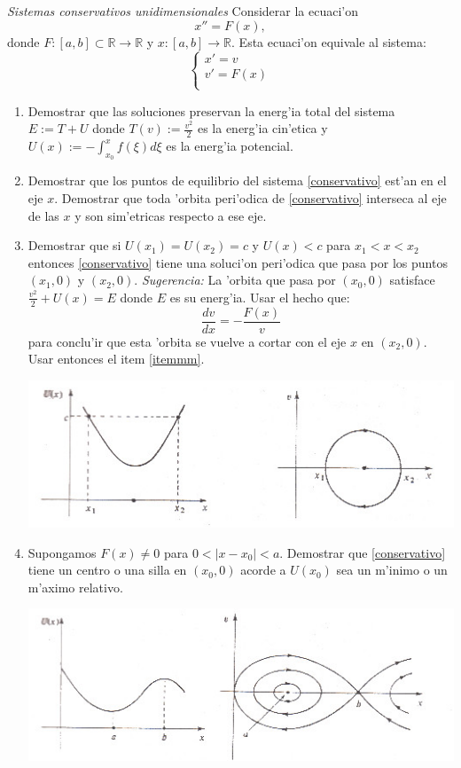 \begin{ejercicio}{}\emph{ Sistemas  conservativos unidimensionales}
Considerar la ecuaci'on
\[
    x''=F(x),
\]
donde $F:[a,b]\subset\mathbb{R}\to\mathbb{R}$ y
$x:[a,b]\to\mathbb{R}$. Esta ecuaci'on equivale al sistema:
\begin{equation}\label{conservativo}
    \left\{%
\begin{array}{ll}
    x'=v \\
    v'=F(x) \\
\end{array}%
\right.
\end{equation}

\begin{enumerate}
\item Demostrar que las soluciones preservan la energ'ia total del sistema
$E:=T+U$ donde $T(v):=\frac{v^2}{2}$ es la energ'ia cin'etica y
$U(x):=-\int_{x_0}^x  f(\xi)d\xi$ es la energ'ia potencial.
\item\label{itemmm} Demostrar que los puntos de equilibrio del sistema
\eqref{conservativo} est'an en el eje $x$. Demostrar que toda
'orbita peri'odica de \eqref{conservativo} interseca al eje de las
$x$ y son sim'etricas respecto a ese eje.
\item Demostrar que si $U(x_1)=U(x_2)=c$ y $U(x)<c$ para
$x_1<x<x_2$ entonces \eqref{conservativo} tiene una soluci'on
peri'odica que pasa por los puntos $(x_1,0)$ y $(x_2,0)$.
\emph{Sugerencia:} La 'orbita que pasa por $(x_0,0)$  satisface
$\frac{v^2}{2}+U(x)=E$ donde $E$ es su energ'ia. Usar el hecho
que:
\[
    \frac{dv}{dx}=-\frac{F(x)}{v}
\]
para conclu'ir que esta 'orbita se vuelve a cortar con el eje $x$
en $(x_2,0)$. Usar entonces el item \ref{itemmm}.

\includegraphics{imagenes/dibu4.jpg}

\item Supongamos $F(x)\neq 0$ para $0<|x-x_0|<a$. Demostrar que
\eqref{conservativo} tiene un centro o una silla en $(x_0,0)$
acorde a $U(x_0)$ sea un m'inimo o un m'aximo relativo.

\includegraphics{imagenes/dibu5.jpg}
\end{enumerate}


\end{ejercicio}

